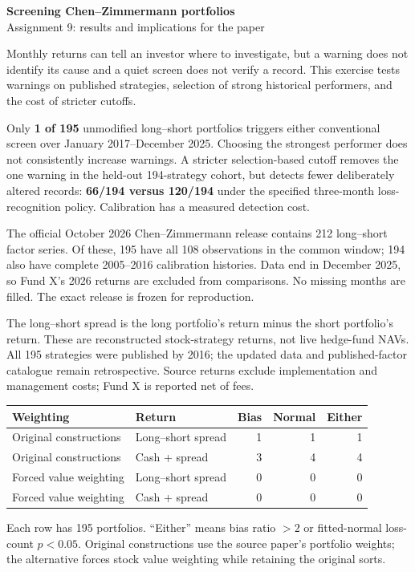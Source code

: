 \documentclass[11pt,letterpaper]{article}
\newcommand{\subhead}[1]{\vspace{5pt}{\large\bfseries #1}\par}
\newcommand{\note}[1]{{\small #1\par}}
\begin{document}
\begin{center}
{\LARGE\bfseries Screening Chen--Zimmermann portfolios}\\[5pt]
{\large Assignment 9: results and implications for the paper}
\end{center}

\subhead{What the results show}
Monthly returns can tell an investor where to investigate, but a warning does not identify its cause and a quiet screen does not verify a record. This exercise tests warnings on published strategies, selection of strong historical performers, and the cost of stricter cutoffs.

Only \textbf{1 of 195} unmodified long--short portfolios triggers either conventional screen over January 2017--December 2025. Choosing the strongest performer does not consistently increase warnings. A stricter selection-based cutoff removes the one warning in the held-out 194-strategy cohort, but detects fewer deliberately altered records: \textbf{66/194 versus 120/194} under the specified three-month loss-recognition policy. Calibration has a measured detection cost.

\subhead{Data and the economic comparison}
The official October 2026 Chen--Zimmermann release contains 212 long--short factor series. Of these, 195 have all 108 observations in the common window; 194 also have complete 2005--2016 calibration histories. Data end in December 2025, so Fund X's 2026 returns are excluded from comparisons. No missing months are filled. The exact release is frozen for reproduction.

The long--short spread is the long portfolio's return minus the short portfolio's return. These are reconstructed stock-strategy returns, not live hedge-fund NAVs. All 195 strategies were published by 2016; the updated data and published-factor catalogue remain retrospective. Source returns exclude implementation and management costs; Fund X is reported net of fees.

\begin{center}
\begin{tabular}{llrrr}
\toprule
Weighting & Return & Bias & Normal & Either \\
\midrule
Original constructions & Long--short spread & 1 & 1 & 1 \\
Original constructions & Cash + spread & 3 & 4 & 4 \\
Forced value weighting & Long--short spread & 0 & 0 & 0 \\
Forced value weighting & Cash + spread & 0 & 0 & 0 \\
\bottomrule
\end{tabular}
\end{center}
\note{Each row has 195 portfolios. ``Either'' means bias ratio $>2$ or fitted-normal loss-count $p<0.05$. Original constructions use the source paper's portfolio weights; the alternative forces stock value weighting while retaining the original sorts.}
\end{document}
